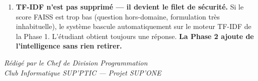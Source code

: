 \documentclass[11pt,a4paper]{article}
\begin{document}
\begin{important}
\begin{enumerate}
    \item \textbf{TF-IDF n'est pas supprimé --- il devient le filet de sécurité.}
    Si le score FAISS est trop bas (question hors-domaine,
    formulation très inhabituelle), le système bascule
    automatiquement sur le moteur TF-IDF de la Phase 1.
    L'étudiant obtient toujours une réponse.
    \textbf{La Phase 2 ajoute de l'intelligence sans rien retirer.}
\end{enumerate}
\end{important}

    \vfill

    \begin{minipage}{0.8\textwidth}
        \centering
        \small
        \textit{Rédigé par le Chef de Division Programmation} \\
        \textit{Club Informatique SUP'PTIC --- Projet SUP'ONE}
    \end{minipage}
\end{document}
